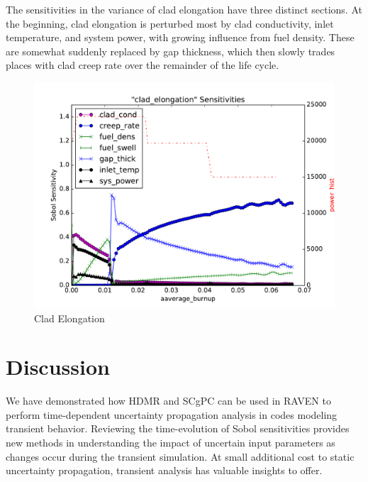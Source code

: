 \documentclass{anstrans} \usepackage{amsmath} \usepackage{amssymb}
\begin{document}
The sensitivities in the variance of clad elongation have three distinct sections.  At the beginning, clad
elongation is perturbed most by clad conductivity, inlet temperature, and system power, with growing influence
from fuel density.  These are somewhat suddenly replaced by gap thickness, which then slowly trades places
with clad creep rate over the remainder of the life cycle.
\begin{figure}[H]
  \centering
  \includegraphics[width=\linewidth]{./sens_clad_elongation}
  \caption{Clad Elongation}
  \label{fig:elong}
\end{figure}


\section{Discussion}
We have demonstrated how HDMR and SCgPC can be used in RAVEN to perform time-dependent uncertainty propagation
analysis in codes modeling transient behavior.  Reviewing the time-evolution of Sobol sensitivities provides
new methods in understanding the impact of uncertain input parameters as changes occur during the transient
simulation.  At small additional cost to static uncertainty propagation, transient analysis has valuable
insights to offer.

{}

\end{document}
